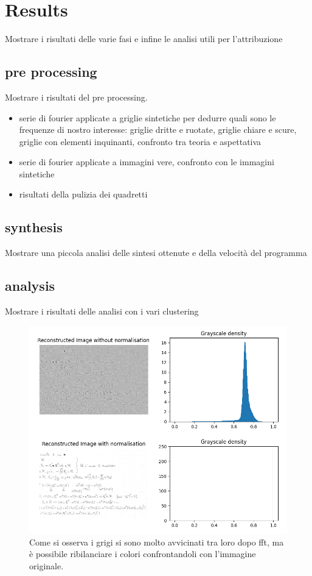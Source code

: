 \chapter{Results}
\begin{toReview}
Mostrare i risultati delle varie fasi e infine le analisi utili per l'attribuzione
    \section{pre processing}
    Mostrare i risultati del pre processing.
    \begin{itemize}
        \item serie di fourier applicate a griglie sintetiche per dedurre quali sono le frequenze di nostro interesse: griglie dritte e ruotate, griglie chiare e scure, griglie con elementi inquinanti, confronto tra teoria e aspettativa
        \item serie di fourier applicate a immagini vere, confronto con le immagini sintetiche
        \item risultati della pulizia dei quadretti
    \end{itemize}
    \section{synthesis}
    Mostrare una piccola analisi delle sintesi ottenute e della velocità del programma
    \section{analysis}
    Mostrare i risultati delle analisi con i vari clustering
\end{toReview}



\begin{figure}
	\centering
	\includegraphics[width=\linewidth]{Figures/first_reconstruct.png}
	\caption{Come si osserva i grigi si sono molto avvicinati tra loro dopo \gls{fft}, ma è possibile ribilanciare i colori confrontandoli con l'immagine originale.}
	\label{fig:first_reconstruct}
\end{figure}
